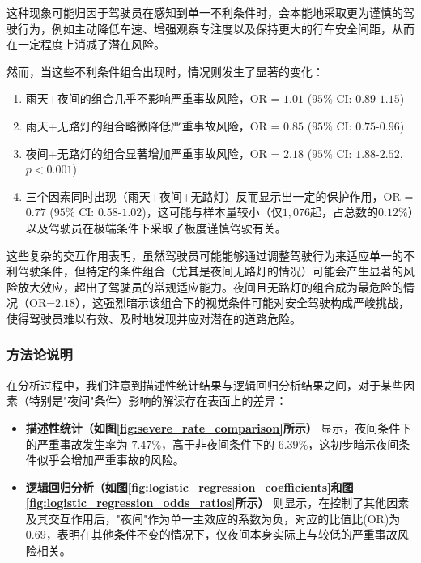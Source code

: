 \documentclass[12pt,a4paper]{article}
\begin{document}
这种现象可能归因于驾驶员在感知到单一不利条件时，会本能地采取更为谨慎的驾驶行为，例如主动降低车速、增强观察专注度以及保持更大的行车安全间距，从而在一定程度上消减了潜在风险。

然而，当这些不利条件组合出现时，情况则发生了显著的变化：

\begin{enumerate}
\item 雨天+夜间的组合几乎不影响严重事故风险，OR = $1.01$ ($95\%$ CI: $0.89$-$1.15$)
\item 雨天+无路灯的组合略微降低严重事故风险，OR = $0.85$ ($95\%$ CI: $0.75$-$0.96$)
\item 夜间+无路灯的组合显著增加严重事故风险，OR = $2.18$ ($95\%$ CI: $1.88$-$2.52$, $p < 0.001$)
\item 三个因素同时出现（雨天+夜间+无路灯）反而显示出一定的保护作用，OR = $0.77$ ($95\%$ CI: $0.58$-$1.02$)，这可能与样本量较小（仅$1,076$起，占总数的$0.12\%$）以及驾驶员在极端条件下采取了极度谨慎驾驶有关。
\end{enumerate}

这些复杂的交互作用表明，虽然驾驶员可能能够通过调整驾驶行为来适应单一的不利驾驶条件，但特定的条件组合（尤其是夜间无路灯的情况）可能会产生显著的风险放大效应，超出了驾驶员的常规适应能力。夜间且无路灯的组合成为最危险的情况（OR=$2.18$），这强烈暗示该组合下的视觉条件可能对安全驾驶构成严峻挑战，使得驾驶员难以有效、及时地发现并应对潜在的道路危险。

\subsubsection{方法论说明}

在分析过程中，我们注意到描述性统计结果与逻辑回归分析结果之间，对于某些因素（特别是"夜间"条件）影响的解读存在表面上的差异：

\begin{itemize}
\item \textbf{描述性统计（如图\ref{fig:severe_rate_comparison}所示）} 显示，夜间条件下的严重事故发生率为 $7.47\%$，高于非夜间条件下的 $6.39\%$，这初步暗示夜间条件似乎会增加严重事故的风险。

\item \textbf{逻辑回归分析（如图\ref{fig:logistic_regression_coefficients}和图\ref{fig:logistic_regression_odds_ratios}所示）} 则显示，在控制了其他因素及其交互作用后，"夜间"作为单一主效应的系数为负，对应的比值比(OR)为 $0.69$，表明在其他条件不变的情况下，仅夜间本身实际上与较低的严重事故风险相关。
\end{itemize}
\end{document}
